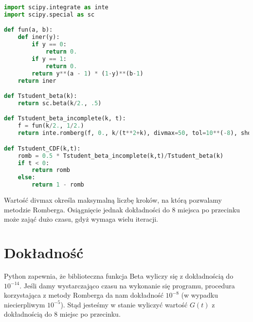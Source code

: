 \documentclass{article}
\begin{document}
\begin{lstlisting}[language=Python]
import scipy.integrate as inte
import scipy.special as sc

def fun(a, b):
    def iner(y):
        if y == 0:
            return 0.
        if y == 1:
            return 0.
        return y**(a - 1) * (1-y)**(b-1)
    return iner

def Tstudent_beta(k):
    return sc.beta(k/2., .5)

def Tstudent_beta_incomplete(k, t):
    f = fun(k/2., 1/2.)
    return inte.romberg(f, 0., k/(t**2+k), divmax=50, tol=10**(-8), show=True)

def Tstudent_CDF(k,t):
    romb = 0.5 * Tstudent_beta_incomplete(k,t)/Tstudent_beta(k)
    if t < 0:
        return romb
    else:
        return 1 - romb
\end{lstlisting}

Wartość divmax określa maksymalną liczbę kroków, na którą pozwalamy metodzie Romberga. Osiągnięcie jednak dokładności do $8$ miejsca po przecinku może zająć dużo czasu, gdyż wymaga wielu iteracji.

\section*{Dokładność}

Python zapewnia, że biblioteczna funkcja Beta wyliczy się z dokładnością do $10^{-14}$. Jeśli damy wystarczająco czasu na wykonanie się programu, procedura korzystająca z metody Romberga da nam dokładność $10^{-8}$ (w wypadku niecierpliwym $10^{-5}$). Stąd jesteśmy w stanie wyliczyć wartość $G(t)$ z dokładnością do 8 miejsc po przecinku.
\end{document}
